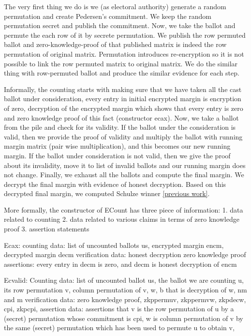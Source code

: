 The very first thing we do is we (as electoral authority) generate a random permutation and create Pedersen's commitment. 
We keep the random permutation secret and publish the commitment. Now, we take the ballot and permute the each row of 
it by secrete permutation. We publish the row permuted ballot and zero-knowledge-proof of that  
published matrix is indeed the row permutation of original matrix. 
Permutation introduces re-encryption so it is not possible to link the row permuted matrix to 
original matrix. We do the similar thing with row-permuted ballot and produce the similar evidence for 
each step.  



Informally, the counting starts with making sure that we have taken all the cast ballot under consideration, every entry 
in initial encrypted margin is encryption of zero, decryption of the encrypted margin which shows that every entry is zero and 
zero knowledge proof of this fact (constructor ecax).  Now, we take a ballot from the pile and check for its validity.  
If the ballot under the consideration is valid, then we provide the proof of validity and multiply the ballot with 
running margin matrix (pair wise multiplication), and this becomes our new running margin. If the ballot under consideration is 
not valid, then we 
give the proof about its invalidity, move it to list of invalid ballots and our running margin does not change. 
Finally, we exhaust all the ballots and compute the final margin. We decrypt the final margin with evidence of 
honest decryption. Based on this decrypted final margin, we computed Schulze winner \ref{previous work}. 

More formally, the constructor of ECount has three piece of information:
1. data related to counting 
2. data related to various claims in terms of zero knowledge proof
3. assertion statements 

Ecax:
counting data: list of uncounted ballots us, encrypted margin encm, decrypted margin decm 
verification data: honest decryption zero knowledge proof
assertions: every entry in decm is zero, and decm is honest decryption of encm

Ecvalid: 
Counting data: list of uncounted ballot us, the ballot we are counting u, its row permutation v, column permutation of 
v, w, b that is decryption of w, nm and m
verification data: zero knowledge proof, zkppermuv, zkppermvw, zkpdecw, cpi, zkpcpi, 
assertion data: assertions that v is the row permutation of u by a (secret) permutation whose commitment is 
cpi, w is column permutation of v by the same (secret) permutation which has been used to permute u to obtain v, 

